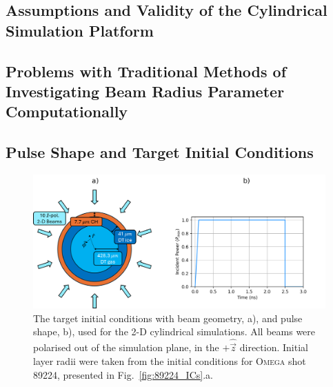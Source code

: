 \subsection{Assumptions and Validity of the Cylindrical Simulation Platform}%
\label{sec:Res1_platformvalidity}


\subsection{Problems with Traditional Methods of Investigating Beam Radius Parameter Computationally}%
\label{sec:Res1_computational_difficulties}


\subsection{Pulse Shape and Target Initial Conditions}%
\label{sec:Res1_initialconditions}

\begin{figure}[t!]
    \includegraphics[width=\linewidth]{Results1/Images/cyl_setup.png}
    \centering
    \caption{The target initial conditions with beam geometry, a), and pulse shape, b), used for the 2-D cylindrical simulations.
    All beams were polarised out of the simulation plane, in the $+\hat{\vec{z}}$ direction.
    Initial layer radii were taken from the initial conditions for \textsc{Omega} shot 89224, presented in Fig.~\ref{fig:89224_ICs}.a.}%
    \label{fig:Res1_cyl_setup}
\end{figure}



